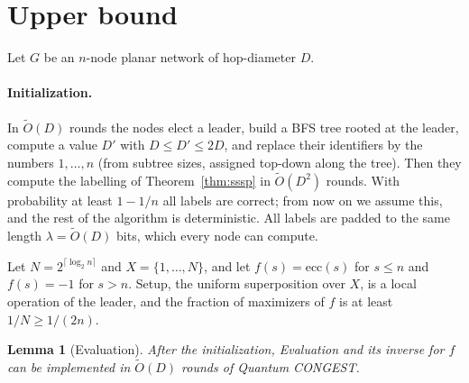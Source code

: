 \documentclass[11pt]{article}
\newtheorem{lemma}[theorem]{Lemma}
\theoremstyle{definition}
\theoremstyle{remark}
\newcommand{\ecc}{\mathrm{ecc}}
\newcommand{\Ot}{\tilde O}
\begin{document}
\section{Upper bound}\label{sec:upper}

Let $G$ be an $n$-node planar network of hop-diameter $D$.

\paragraph{Initialization.} In $\Ot(D)$ rounds the nodes elect a leader, build a BFS tree rooted at the leader, compute a value $D'$ with $D\le D'\le 2D$, and replace their identifiers by the numbers $1,\dots,n$ (from subtree sizes, assigned top-down along the tree). Then they compute the labelling of Theorem~\ref{thm:sssp} in $\Ot(D^2)$ rounds. With probability at least $1-1/n$ all labels are correct; from now on we assume this, and the rest of the algorithm is deterministic. All labels are padded to the same length $\lambda=\Ot(D)$ bits, which every node can compute.

Let $N=2^{\lceil\log_2 n\rceil}$ and $X=\{1,\dots,N\}$, and let $f(s)=\ecc(s)$ for $s\le n$ and $f(s)=-1$ for $s>n$. Setup, the uniform superposition over $X$, is a local operation of the leader, and the fraction of maximizers of $f$ is at least $1/N\ge 1/(2n)$.

\begin{lemma}[Evaluation]\label{lem:eval}
After the initialization, Evaluation and its inverse for $f$ can be implemented in $\Ot(D)$ rounds of Quantum CONGEST.
\end{lemma}
\end{document}
